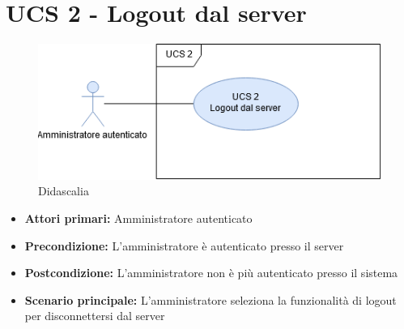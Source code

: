 \section{UCS 2 - Logout dal server}
\begin{figure}[h]
  \caption{Didascalia}
  \centering
    \includegraphics[scale=0.8]{sezioni/UseCase/Immagini/UCS2.png}
\end{figure}
\begin{itemize}
\item \textbf{Attori primari:} Amministratore autenticato
\item \textbf{Precondizione:} L'amministratore è autenticato presso il server
\item \textbf{Postcondizione:}  L'amministratore non è più autenticato presso il sistema
\item \textbf{Scenario principale:} L'amministratore seleziona la funzionalità di logout per disconnettersi dal server
\end{itemize}

